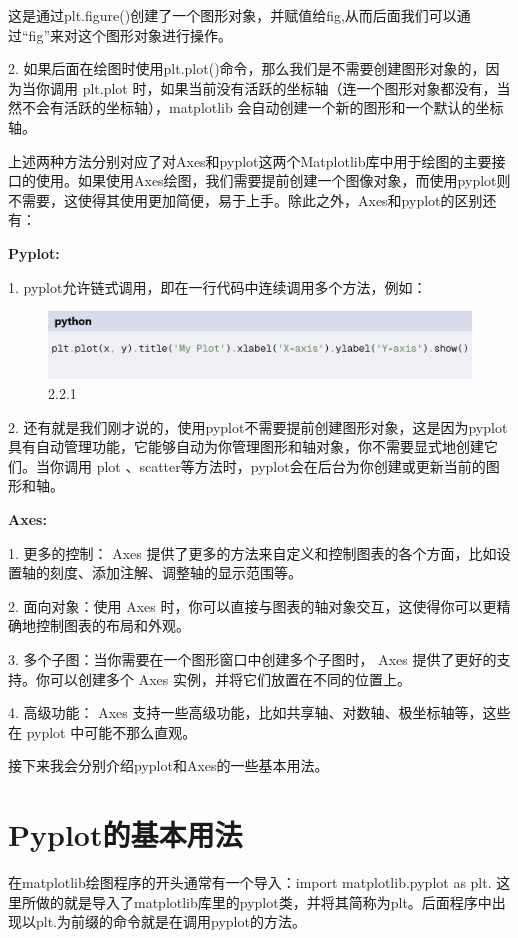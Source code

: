 \documentclass[12pt]{article}
\begin{document}
这是通过plt.figure()创建了一个图形对象，并赋值给fig,从而后面我们可以通过“fig”来对这个图形对象进行操作。

2. 如果后面在绘图时使用plt.plot()命令，那么我们是不需要创建图形对象的，因为当你调用 plt.plot 时，如果当前没有活跃的坐标轴（连一个图形对象都没有，当然不会有活跃的坐标轴），matplotlib 会自动创建一个新的图形和一个默认的坐标轴。

上述两种方法分别对应了对Axes和pyplot这两个Matplotlib库中用于绘图的主要接口的使用。如果使用Axes绘图，我们需要提前创建一个图像对象，而使用pyplot则不需要，这使得其使用更加简便，易于上手。除此之外，Axes和pyplot的区别还有：

\noindent\textbf{Pyplot:}

1. pyplot允许链式调用，即在一行代码中连续调用多个方法，例如：
\begin{figure}[H]
    \centering
    \includegraphics[width=1\linewidth]{1.png}
    \caption{2.2.1}
    \label{fig:enter-label}
\end{figure}
2. 还有就是我们刚才说的，使用pyplot不需要提前创建图形对象，这是因为pyplot具有自动管理功能，它能够自动为你管理图形和轴对象，你不需要显式地创建它们。当你调用   plot 、scatter等方法时，pyplot会在后台为你创建或更新当前的图形和轴。

\noindent\textbf{Axes:}

1. 更多的控制：  Axes   提供了更多的方法来自定义和控制图表的各个方面，比如设置轴的刻度、添加注解、调整轴的显示范围等。

2. 面向对象：使用   Axes   时，你可以直接与图表的轴对象交互，这使得你可以更精确地控制图表的布局和外观。

3. 多个子图：当你需要在一个图形窗口中创建多个子图时，  Axes   提供了更好的支持。你可以创建多个   Axes   实例，并将它们放置在不同的位置上。

4. 高级功能：  Axes   支持一些高级功能，比如共享轴、对数轴、极坐标轴等，这些在   pyplot   中可能不那么直观。

接下来我会分别介绍pyplot和Axes的一些基本用法。

\section{Pyplot的基本用法}
在matplotlib绘图程序的开头通常有一个导入：import matplotlib.pyplot as plt. 这里所做的就是导入了matplotlib库里的pyplot类，并将其简称为plt。后面程序中出现以plt.为前缀的命令就是在调用pyplot的方法。
\end{document}
